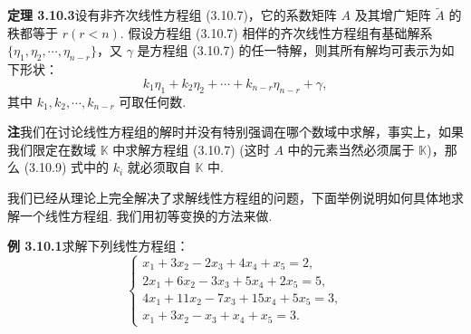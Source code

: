 \documentclass[UTF8, 12pt, fontset=fandol, oneside]{ctexart}
\begin{document}
\noindent\textbf{定理 3.10.3}\quad 设有非齐次线性方程组 (3.10.7)，它的系数矩阵 $A$ 及其增广矩阵 $\widetilde{A}$ 的秩都等于 $r(r<n)$. 假设方程组 (3.10.7) 相伴的齐次线性方程组有基础解系 $\{\eta_1,\eta_2,\cdots,\eta_{n-r}\}$，又 $\gamma$ 是方程组 (3.10.7) 的任一特解，则其所有解均可表示为如下形状：
\begin{equation}
k_1\eta_1+k_2\eta_2+\cdots+k_{n-r}\eta_{n-r}+\gamma,
\tag{3.10.9}
\end{equation}
其中 $k_1,k_2,\cdots,k_{n-r}$ 可取任何数.

\noindent\textbf{注}\quad 我们在讨论线性方程组的解时并没有特别强调在哪个数域中求解，事实上，如果我们限定在数域 $\mathbb{K}$ 中求解方程组 (3.10.7) (这时 $A$ 中的元素当然必须属于 $\mathbb{K}$)，那么 (3.10.9) 式中的 $k_i$ 就必须取自 $\mathbb{K}$ 中.

我们已经从理论上完全解决了求解线性方程组的问题，下面举例说明如何具体地求解一个线性方程组. 我们用初等变换的方法来做.

\noindent\textbf{例 3.10.1}\quad 求解下列线性方程组：
\[
\left\{\begin{array}{r}
x_1+3x_2-2x_3+4x_4+x_5=2,\\
2x_1+6x_2-3x_3+5x_4+2x_5=5,\\
4x_1+11x_2-7x_3+15x_4+5x_5=3,\\
x_1+3x_2-x_3+x_4+x_5=3.
\end{array}\right.
\]
\end{document}
